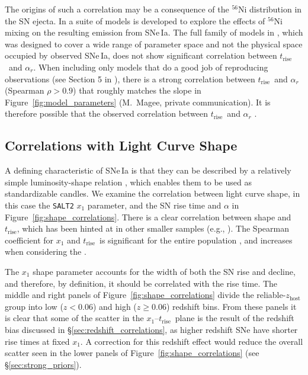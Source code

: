 \documentclass[twocolumn]{./aastex63}
\newcommand{\trise}{$t_\mathrm{rise}$}
\begin{document}
The origins of such a correlation may be a consequence of the $^{56}$Ni
distribution in the SN ejecta. In \citet{Magee20} a suite of models is
developed to explore the effects of $^{56}$Ni mixing on the resulting emission
from SNe\,Ia. The full family of models in \citet{Magee20}, which was designed
to cover a wide range of parameter space and not the physical space occupied
by observed SNe\,Ia, does not show significant correlation between \trise\ and
$\alpha_r$. When including only models that do a good job of reproducing
observations (see Section 5 in \citealt{Magee20}), there is a strong
correlation between \trise\ and $\alpha_r$ (Spearman $\rho > 0.9$) that
roughly matches the slope in Figure~\ref{fig:model_parameters} (M.~Magee,
private communication). It is therefore possible that the observed correlation
between \trise\ and $\alpha_r$ .

\subsection{Correlations with Light Curve Shape}

A defining characteristic of SNe\,Ia is that they can be described by a
relatively simple luminosity-shape relation \citep{Phillips93}, which enables
them to be used as standardizable candles. We examine the correlation between
light curve shape, in this case the \texttt{SALT2} $x_1$ parameter, and the SN
rise time and $\alpha$ in Figure~\ref{fig:shape_correlations}. There is a
clear correlation between shape and \trise, which has been hinted at in other
smaller samples (e.g., \citealt{Riess99a,Firth15,Zheng17a}). The Spearman
coefficient for $x_1$ and \trise\ is significant for the entire population
, and increases when considering the .

The $x_1$ shape parameter accounts for the width of both the SN rise and
decline, and therefore, by definition, it should be correlated with the rise
time. The middle and right panels of Figure~\ref{fig:shape_correlations}
divide the reliable-$z_\mathrm{host}$ group into low ($z < 0.06$) and high ($z
\ge 0.06$) redshift bins. From these panels it is clear that some of the
scatter in the $x_1$--\trise\ plane is the result of the redshift bias
discussed in \S\ref{sec:redshift_correlations}, as higher redshift SNe have
shorter rise times at fixed $x_1$. A correction for this redshift effect would
reduce the overall scatter seen in the lower panels of
Figure~\ref{fig:shape_correlations} (see \S\ref{sec:strong_priors}).
\end{document}

